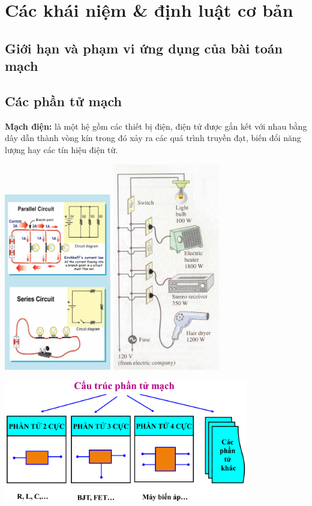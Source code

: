 \section{Các khái niệm \& định luật cơ bản}
\subsection{Giới hạn và phạm vi ứng dụng của bài toán mạch }
\subsection{Các phần tử mạch}
\textbf{Mạch điện:} là một hệ gồm các thiết bị điện, điện tử được gắn kết với nhau bằng dây dẫn thành vòng kín trong đó xảy ra các quá trình truyền đạt, biến đổi năng lượng hay các tín hiệu điện từ.
\begin{center}
  \includegraphics[width=0.35\textwidth]{./image/1(1).png} \quad \quad \quad \quad \includegraphics[width=0.35\textwidth]{./image/1(2).png}
\end{center}
\begin{center}
  \includegraphics[width=0.8\textwidth]{./image/2.png}
\end{center}
